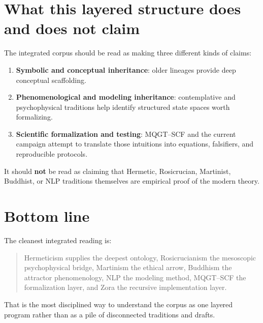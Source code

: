 \documentclass[11pt]{article}
\begin{document}
\section*{What this layered structure does and does not claim}
The integrated corpus should be read as making three different kinds of claims:
\begin{enumerate}
    \item \textbf{Symbolic and conceptual inheritance}: older lineages provide deep conceptual scaffolding.
    \item \textbf{Phenomenological and modeling inheritance}: contemplative and psychophysical traditions help identify structured state spaces worth formalizing.
    \item \textbf{Scientific formalization and testing}: MQGT--SCF and the current campaign attempt to translate those intuitions into equations, falsifiers, and reproducible protocols.
\end{enumerate}

It should \textbf{not} be read as claiming that Hermetic, Rosicrucian, Martinist, Buddhist, or NLP traditions themselves are empirical proof of the modern theory.

\section*{Bottom line}
The cleanest integrated reading is:
\begin{quote}
Hermeticism supplies the deepest ontology, Rosicrucianism the mesoscopic psychophysical bridge, Martinism the ethical arrow, Buddhism the attractor phenomenology, NLP the modeling method, MQGT--SCF the formalization layer, and Zora the recursive implementation layer.
\end{quote}
That is the most disciplined way to understand the corpus as one layered program rather than as a pile of disconnected traditions and drafts.
\end{document}
